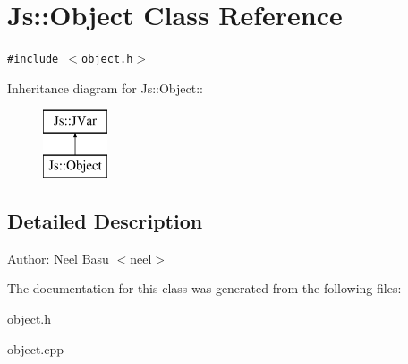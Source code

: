 \section{Js::Object Class Reference}
\label{classJs_1_1Object}
{\tt \#include $<$object.h$>$}

Inheritance diagram for Js::Object::\begin{figure}[H]
\begin{center}
\leavevmode
\includegraphics[height=2cm]{classJs_1_1Object}
\end{center}
\end{figure}


\subsection{Detailed Description}
\begin{Desc}
\item[Author:]Neel Basu $<$neel$>$ \end{Desc}


The documentation for this class was generated from the following files:\begin{CompactItemize}
\item 
object.h\item 
object.cpp\end{CompactItemize}
